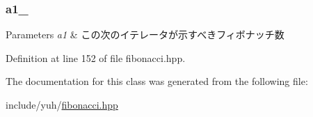 \hypertarget{classyuh_1_1range__detail_1_1fibonacci__iterator_ab72f8fd5789483ff52778966e56e0929}{
\subsubsection[{a1\-\_\-}]{ {\bf a1\-\_\-}}}\label{df/d65/classyuh_1_1range__detail_1_1fibonacci__iterator_ab72f8fd5789483ff52778966e56e0929}

\begin{DoxyParams}{\-Parameters}
{\em a1} & この次のイテレータが示すべきフィボナッチ数 \\
\hline
\end{DoxyParams}


\-Definition at line 152 of file fibonacci.\-hpp.



\-The documentation for this class was generated from the following file\-:\begin{DoxyCompactItemize}
\item 
include/yuh/\hyperlink{fibonacci_8hpp}{fibonacci.\-hpp}\end{DoxyCompactItemize}
